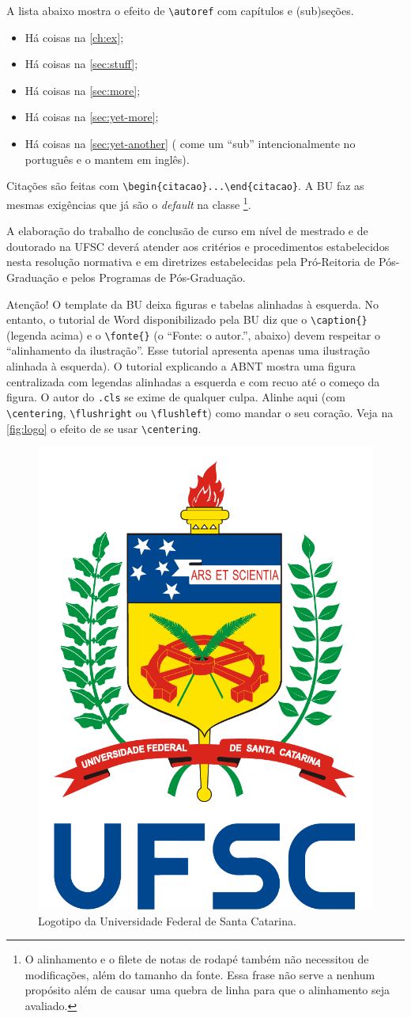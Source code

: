 \documentclass[embeddedlogo]{../ufsc-thesis-rn46-2019}
\newcommand{\lacmd}[1]{\texttt{\textbackslash{}#1}}
\newcommand{\laenv}[1]{\texttt{\textbackslash{}begin\{#1\}...\textbackslash{}end\{#1\}}}
\begin{document}
A lista abaixo mostra o efeito de \lacmd{autoref{}} com capítulos e (sub)seções.

\begin{itemize}
\item Há coisas na \autoref{ch:ex};
\item Há coisas na \autoref{sec:stuff};
\item Há coisas na \autoref{sec:more};
\item Há coisas na \autoref{sec:yet-more};
\item Há coisas na \autoref{sec:yet-another} (\abnTeX{} come um ``sub''
  intencionalmente no português e o mantem em inglês).
\end{itemize}

Citações são feitas com \laenv{citacao}. A BU faz as mesmas exigências que já
são o \textit{default} na classe \abnTeX\footnote{O alinhamento e o filete de
  notas de rodapé também não necessitou de modificações, além do tamanho da
  fonte. Essa frase não serve a nenhum propósito além de causar uma quebra de
  linha para que o alinhamento seja avaliado.}.

\begin{citacao}
  A elaboração do trabalho de conclusão de curso em nível de mestrado
  e de doutorado na UFSC deverá atender aos critérios e procedimentos
  estabelecidos nesta resolução normativa e em diretrizes
  estabelecidas pela Pró-Reitoria de Pós-Graduação e pelos Programas
  de Pós-Graduação.
\end{citacao}

Atenção! O template da BU deixa figuras e tabelas alinhadas à esquerda. No
entanto, o tutorial de Word disponibilizado pela BU diz que o \lacmd{caption\{\}}
(legenda acima) e o \lacmd{fonte\{\}} (o ``Fonte: o autor.'', abaixo) devem
respeitar o ``alinhamento da ilustração''. Esse tutorial apresenta apenas uma
ilustração alinhada à esquerda). O tutorial explicando a ABNT mostra uma figura
centralizada com legendas alinhadas a esquerda e com recuo até o começo da
figura. O autor do \texttt{.cls} se exime de qualquer culpa. Alinhe aqui (com
\lacmd{centering}, \lacmd{flushright} ou \lacmd{flushleft}) como mandar o seu
coração. Veja na \autoref{fig:logo} o efeito de se usar \lacmd{centering}.

\begin{figure}[t]
  \centering
  \caption{Logotipo da Universidade Federal de Santa Catarina.}
  \label{fig:logo}

  \includegraphics[width=.2\linewidth]{../logo-ufsc.pdf}
\end{figure}
\end{document}
